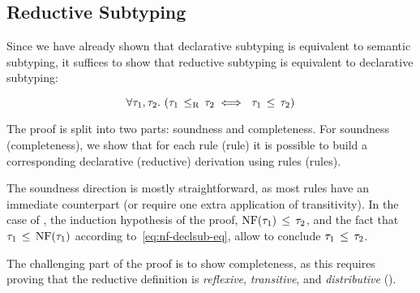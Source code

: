 \subsection{Reductive Subtyping}\label{sec:redsub-correct}

Since we have already shown that declarative subtyping is
equivalent to semantic subtyping, it suffices to show that
reductive subtyping is equivalent to declarative subtyping:

\begin{theorem}\label{thm:redsub-correct}
\[
\forall \ty_1, \ty_2.\ (\bjsubr{\ty_1}{\ty_2} \iff\ \bjsub{\ty_1}{\ty_2})
\]
\end{theorem}

The proof is split into two parts: soundness and completeness.
For soundness (completeness), 
we show that for each \RR{}\!rule (\RD{}\!rule) it is possible to build
a corresponding declarative (reductive) derivation 
using \RD{}\!rules (\RR{}\!rules).

The soundness direction is mostly straightforward, as most \RR{}\!rules
have an immediate \RD{}\!counterpart (or require one extra application
of transitivity).
In the case of , the induction hypothesis of the proof,
$\mathop{\mathrm{NF}}(\tau_1) \, \leq \, \tau_2$, 
and the fact that $\tau_1 \, \leq \, \mathop{\mathrm{NF}}(\tau_1)$ 
according to~\eqref{eq:nf-declsub-eq},
allow to conclude $\tau_1 \, \leq \, \tau_2$.

The challenging part of the proof is to show completeness,
as this requires proving that the reductive definition 
is \emph{reflexive}, \emph{transitive}, and \emph{distributive}
().


